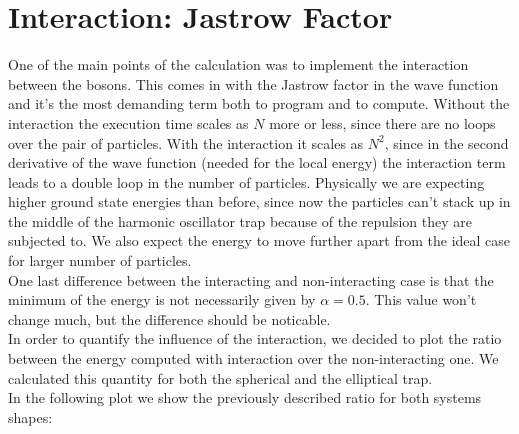 \documentclass[10pt,a4paper,titlepage]{article}
\begin{document}
\section*{Interaction: Jastrow Factor}
\noindent One of the main points of the calculation was to implement the interaction between the bosons. This comes in with the Jastrow factor in the wave function and it's the most demanding term both to program and to compute. Without the interaction the execution time scales as $N$ more or less, since there are no loops over the pair of particles. With the interaction it scales as $N^2$, since in the second derivative of the wave function (needed for the local energy) the interaction term leads to a double loop in the number of particles.
Physically we are expecting higher ground state energies than before, since now the particles can't stack up in the middle of the harmonic oscillator trap because of the repulsion they are subjected to. We also expect the energy to move further apart from the ideal case for larger number of particles. \\
One last difference between the interacting and non-interacting case is that the minimum of the energy is not necessarily given by $\alpha = 0.5$. This value won't change much, but the difference should be noticable.\\
In order to quantify the influence of the interaction, we decided to plot the ratio between the energy computed with interaction over the non-interacting one. We calculated this quantity for both the spherical and the elliptical trap. \\
In the following plot we show the previously described ratio for both systems shapes:
\end{document}
